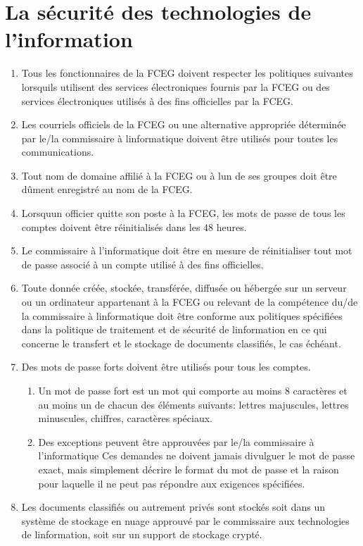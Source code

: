\section{La sécurité des technologies de l'information}
\label{la-securite-des-technologies-de-l-information}

\begin{enumerate}
 \item
  Tous les fonctionnaires de la FCEG doivent respecter les politiques suivantes lorsqu\textquotesingle ils utilisent des services électroniques fournis par la FCEG ou des services électroniques utilisés à des fins officielles par la FCEG.
 \item
  Les courriels officiels de la FCEG ou une alternative appropriée déterminée par le/la commissaire à l\textquotesingle informatique doivent être utilisés pour toutes les communications.
 \item
  Tout nom de domaine affilié à la FCEG ou à l\textquotesingle un de ses groupes doit être dûment enregistré au nom de la FCEG.
 \item
  Lorsqu\textquotesingle un officier quitte son poste à la FCEG, les mots de passe de tous les comptes doivent être réinitialisés dans les 48 heures.
 \item
  Le commissaire à l'informatique doit être en mesure de réinitialiser tout mot de passe associé à un compte utilisé à des fins officielles.
 \item
  Toute donnée créée, stockée, transférée, diffusée ou hébergée sur un serveur ou un ordinateur appartenant à la FCEG ou relevant de la compétence du/de la commissaire à l\textquotesingle informatique doit être conforme aux politiques spécifiées dans la politique de traitement et de sécurité de l\textquotesingle information en ce qui concerne le transfert et le stockage de documents classifiés, le cas échéant.
 \item
  Des mots de passe forts doivent être utilisés pour tous les comptes.

  \begin{enumerate}
   \item
    Un mot de passe fort est un mot qui comporte au moins 8 caractères et au moins un de chacun des éléments suivants: lettres majuscules, lettres minuscules, chiffres, caractères spéciaux.
   \item
    Des exceptions peuvent être approuvées par le/la commissaire à l'informatique Ces demandes ne doivent jamais divulguer le mot de passe exact, mais simplement décrire le format du mot de passe et la raison pour laquelle il ne peut pas répondre aux exigences spécifiées.
  \end{enumerate}
 \item
  Les documents classifiés ou autrement privés sont stockés soit dans un système de stockage en nuage approuvé par le commissaire aux technologies de l\textquotesingle information, soit sur un support de stockage crypté.


\end{enumerate}
